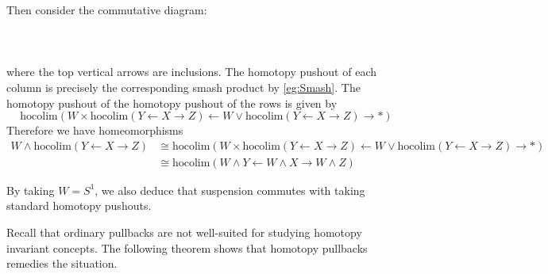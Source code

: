 \begin{eg}
Then consider the commutative diagram: \\~\\
\\~\\
where the top vertical arrows are inclusions. The homotopy pushout of each column is precisely the corresponding smash product by \ref{eg:Smash}. The homotopy pushout of the homotopy pushout of the rows is given by $$\text{hocolim}(W\times\text{hocolim}(Y\leftarrow X\rightarrow Z)\leftarrow W\vee\text{hocolim}(Y\leftarrow X\rightarrow Z)\rightarrow\ast)$$ Therefore we have homeomorphisms 
\begin{align*}
W\wedge\text{hocolim}(Y\leftarrow X\rightarrow Z)&\cong\text{hocolim}(W\times\text{hocolim}(Y\leftarrow X\rightarrow Z)\leftarrow W\vee\text{hocolim}(Y\leftarrow X\rightarrow Z)\rightarrow\ast)\\
&\cong\text{hocolim}(W\wedge Y\leftarrow W\wedge X\rightarrow W\wedge Z)
\end{align*}
\end{eg}

By taking $W=S^1$, we also deduce that suspension commutes with taking standard homotopy pushouts. 

Recall that ordinary pullbacks are not well-suited for studying homotopy invariant concepts. The following theorem shows that homotopy pullbacks remedies the situation. 

